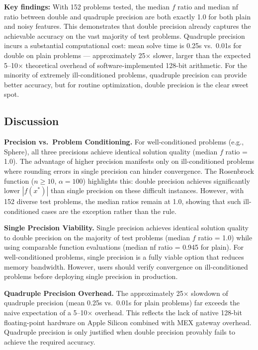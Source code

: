 \documentclass[11pt,a4paper]{article}
\begin{document}
\textbf{Key findings:} With 152 problems tested, the median $f$ ratio and
median nf ratio between double and quadruple precision are both exactly 1.0 for
both plain and noisy features. This demonstrates that double precision already
captures the achievable accuracy on the vast majority of test problems.
Quadruple precision incurs a substantial computational cost: mean solve time is
0.25s vs.\ 0.01s for double on plain problems --- approximately 25$\times$ slower,
larger than the expected 5--10$\times$ theoretical overhead of software-implemented
128-bit arithmetic. For the minority of extremely ill-conditioned problems,
quadruple precision can provide better accuracy, but for routine optimization,
double precision is the clear sweet spot.

\subsection{Discussion}

\textbf{Precision vs.\ Problem Conditioning.} For well-conditioned problems
(e.g., Sphere), all three precisions achieve identical solution quality (median
$f$ ratio = 1.0). The advantage of higher precision manifests only on
ill-conditioned problems where rounding errors in single precision can hinder
convergence. The Rosenbrock function ($n \ge 10$, $\alpha=100$) highlights this:
double precision achieves significantly lower $|f(x^*)|$ than single precision
on these difficult instances. However, with 152 diverse test problems, the
median ratios remain at 1.0, showing that such ill-conditioned cases are the
exception rather than the rule.

\textbf{Single Precision Viability.} Single precision achieves identical solution
quality to double precision on the majority of test problems (median $f$ ratio = 1.0)
while using comparable function evaluations (median nf ratio = 0.945 for plain).
For well-conditioned problems, single precision is a fully viable option that
reduces memory bandwidth. However, users should verify convergence on
ill-conditioned problems before deploying single precision in production.

\textbf{Quadruple Precision Overhead.} The approximately 25$\times$ slowdown of
quadruple precision (mean 0.25s vs.\ 0.01s for plain problems) far exceeds
the naive expectation of a 5--10$\times$ overhead. This reflects the lack of native
128-bit floating-point hardware on Apple Silicon combined with MEX gateway
overhead. Quadruple precision is only justified when double precision provably
fails to achieve the required accuracy.
\end{document}
